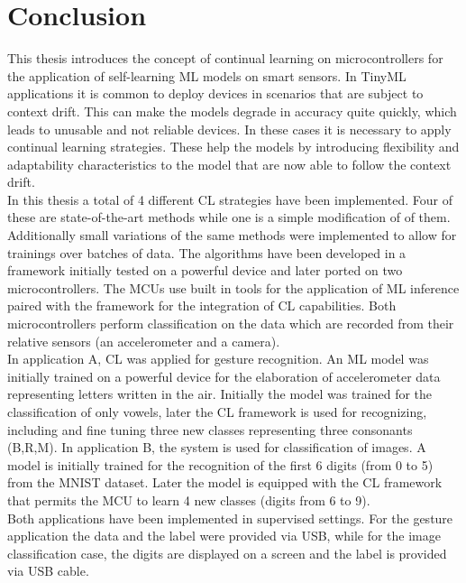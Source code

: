 \documentclass[12pt]{report}
\begin{document}
\chapter{Conclusion}
This thesis introduces the concept of continual learning on microcontrollers for the application of self-learning ML models on smart sensors. In TinyML applications it is common to deploy devices in scenarios that are subject to context drift. This can make the models degrade in accuracy quite quickly, which leads to unusable and not reliable devices. In these cases it is necessary to apply continual learning strategies. These help the models by introducing flexibility and adaptability characteristics to the model that are now able to follow the context drift.\\
In this thesis a total of 4 different CL strategies have been implemented. Four of these are state-of-the-art methods while one is a simple modification of of them. Additionally small variations of the same methods were implemented to allow for trainings over batches of data. The algorithms have been developed in a framework initially tested on a powerful device and later ported on two microcontrollers. The MCUs use built in tools for the application of ML inference paired with the framework for the integration of CL capabilities. Both microcontrollers perform classification on the data which are recorded from their relative sensors (an accelerometer and a camera).\\
In application A, CL was applied for gesture recognition. An ML model was initially trained on a powerful device for the elaboration of accelerometer data representing letters written in the air. Initially the model was trained for the classification of only vowels, later the CL framework is used for recognizing, including and fine tuning three new classes representing three consonants (B,R,M). 
In application B, the system is used for classification of images. A model is initially trained for the recognition of the first 6 digits (from 0 to 5) from the MNIST dataset. Later the model is equipped with the CL framework that permits the MCU to learn 4 new classes (digits from 6 to 9).\\
Both applications have been implemented in supervised settings. For the gesture application the data and the label were provided via USB, while for the image classification case, the digits are displayed on a screen and the label is provided via USB cable.
\end{document}
